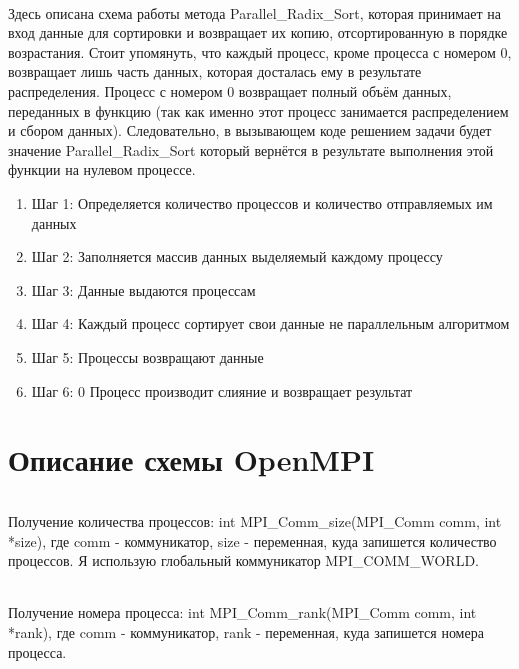 \documentclass[12pt,a4paper]{article}
\begin{document}
\paragraph{}Здесь описана схема работы метода Parallel\_Radix\_Sort, которая принимает на вход данные для сортировки и возвращает их копию, отсортированную в порядке возрастания. Стоит упомянуть, что каждый процесс, кроме процесса с номером 0, возвращает лишь часть данных, которая досталась ему в результате распределения. Процесс с номером 0 возвращает полный объём данных, переданных в функцию (так как именно этот процесс занимается распределением и сбором данных). Следовательно, в вызывающем коде решением задачи будет значение Parallel\_Radix\_Sort который вернётся в результате выполнения этой функции на нулевом процессе.
\begin{enumerate} 
\item Шаг 1: Определяется количество процессов и количество отправляемых им данных
\item Шаг 2: Заполняется массив данных выделяемый каждому процессу
\item Шаг 3: Данные выдаются процессам
\item Шаг 4: Каждый процесс сортирует свои данные не параллельным алгоритмом
\item Шаг 5: Процессы возвращают данные
\item Шаг 6: 0 Процесс производит слияние и возвращает результат
\end{enumerate} 

\part*{Описание схемы OpenMPI}
\paragraph{}Получение количества процессов: int MPI\_Comm\_size(MPI\_Comm comm, int *size), где comm - коммуникатор, size - переменная, куда запишется количество процессов. Я использую глобальный коммуникатор MPI\_COMM\_WORLD.
\paragraph{}Получение номера процесса: int MPI\_Comm\_rank(MPI\_Comm comm, int *rank), где comm - коммуникатор, rank - переменная, куда запишется номера процесса.
\end{document}
